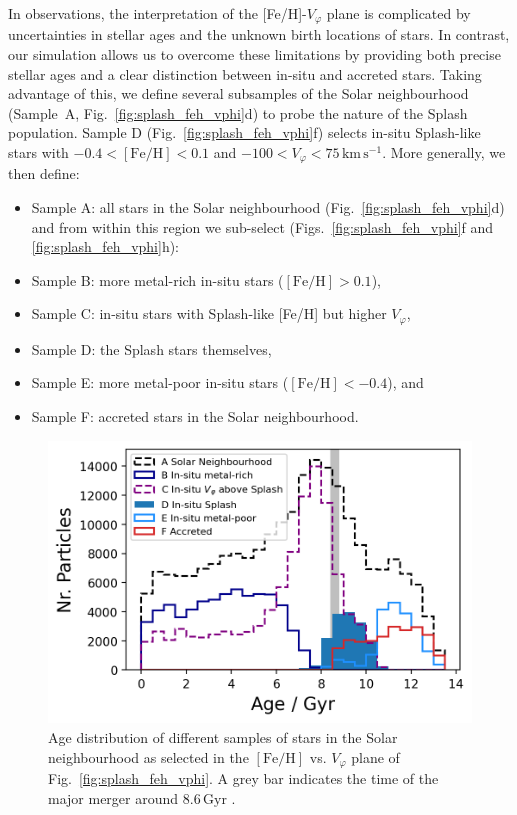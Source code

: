 \documentclass[fleqn,usenatbib]{mnras}
\begin{document}
In observations, the interpretation of the [Fe/H]-$V_\varphi$ plane is complicated by uncertainties in stellar ages and the unknown birth locations of stars. In contrast, our simulation allows us to overcome these limitations by providing both precise stellar ages and a clear distinction between in-situ and accreted stars. Taking advantage of this, we define several subsamples of the Solar neighbourhood (Sample~A, Fig.~\ref{fig:splash_feh_vphi}d) to probe the nature of the Splash population. Sample D (Fig.~\ref{fig:splash_feh_vphi}f) selects in-situ Splash-like stars with $-0.4 < \mathrm{[Fe/H]} < 0.1$ and $-100 < V_\varphi < 75\,\mathrm{km\,s^{-1}}$.  More generally, we then define:
\begin{itemize}[leftmargin=2em,labelwidth=2em]
    \item Sample A: all stars in the Solar neighbourhood (Fig.~\ref{fig:splash_feh_vphi}d) \\
    and from within this region we sub-select (Figs.~\ref{fig:splash_feh_vphi}f and \ref{fig:splash_feh_vphi}h):
    \item Sample B: more metal-rich in-situ stars ($\mathrm{[Fe/H]} > 0.1$),
    \item Sample C: in-situ stars with Splash-like [Fe/H] but higher $V_\varphi$,
    \item Sample D: the Splash stars themselves,
    \item Sample E: more metal-poor in-situ stars ($\mathrm{[Fe/H]} < -0.4$), and
    \item Sample F: accreted stars in the Solar neighbourhood.
\end{itemize}

\begin{figure}
    \centering
    \includegraphics[width=0.9\columnwidth]{figures/splash_age.png}
    \caption{Age distribution of different samples of stars in the Solar neighbourhood as selected in the $\mathrm{[Fe/H]}$ vs. $V_\varphi$ plane of Fig.~\ref{fig:splash_feh_vphi}. A grey bar indicates the time of the major merger around $8.6\,\mathrm{Gyr}$ \href{https://github.com/svenbuder/golden_thread_II/tree/main/figures}{\faGithub}.}
    \label{fig:splash_age}
\end{figure}
\end{document}

